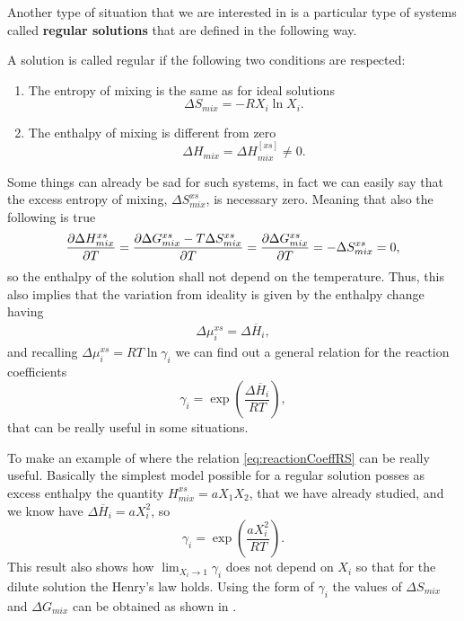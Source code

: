 Another type of situation that we are interested in is a particular type of systems called \textbf{regular solutions} that are defined in the following way.
{
    A solution is called regular if the following two conditions are respected:
    \begin{enumerate}
        \item The entropy of mixing is the same as for ideal solutions
            \begin{equation}
                \Delta S_{mix} = -RX_i \ln X_i.
            \end{equation}
        \item The enthalpy of mixing is different from zero
            \begin{equation}
                \Delta H_{mix} = \Delta H_{mix}^[xs] \neq 0.
            \end{equation}
    \end{enumerate}
}
\noindent
Some things can already be sad for such systems, in fact we can easily say that the excess entropy of mixing, $\Delta S_{mix}^{xs}$, is necessary zero. Meaning that also the following is true
\begin{equation}
    \pdv{\Delta H^{xs}_{mix}}{T} = \pdv{\Delta G_{mix}^{xs} - T\Delta S_{mix}^{xs}}{T} = \pdv{\Delta G_{mix}^{xs}}{T} = -\Delta S_{mix}^{xs} = 0,
\end{equation}
so the enthalpy of the solution shall not depend on the temperature. Thus, this also implies that the variation from ideality is given by the enthalpy change having
\begin{align}
    \Delta\mu_i^{xs} = \Delta \overline{H}_i,
\end{align}
and recalling $\Delta\mu_i^{xs} = RT\ln\gamma_i$ we can find out a general relation for the reaction coefficients
\begin{equation}
    \label{eq:reactionCoeffRS}
    \gamma_i = \exp\left( \frac{\Delta \overline{H}_i}{RT} \right),
\end{equation}
that can be really useful in some situations.

\ex{}
{
    \label{ex:SimpleEnthalpy}
    To make an example of where the relation \eqref{eq:reactionCoeffRS} can be really useful. Basically the simplest model possible for a regular solution posses as excess enthalpy the quantity $H_{mix}^{xs} = aX_1X_2$, that we have already studied, and we know have $\Delta \overline{H}_i = aX_i^2$, so
    \begin{equation}
        \gamma_i = \exp\left( \frac{ aX_i^2}{RT} \right).
    \end{equation}
    This result also shows how $\lim_{X_i\to 1} \gamma_i$ does not depend on $X_i$ so that for the dilute solution the Henry's law holds. Using the form of $\gamma_i$ the values of $\Delta S_{mix}$ and $\Delta G_{mix}$ can be obtained as shown in .
}

